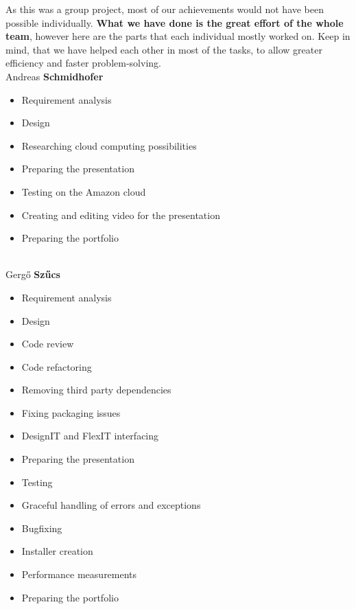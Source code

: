 \documentclass[a4paper, 11pt, article]{report}
\begin{document}
As this was a group project, most of our achievements would not have been possible individually. \textbf{What we have done is the great effort of the whole team}, however here are the parts that each individual mostly worked on. Keep in mind, that we have helped each other in most of the tasks, to allow greater efficiency and faster problem-solving. \\

\noindent Andreas \textbf{Schmidhofer} 
\begin{itemize}
	\item Requirement analysis
	\item Design
	\item Researching cloud computing possibilities
	\item Preparing the presentation
	\item Testing on the Amazon cloud
	\item Creating and editing video for the presentation
	\item Preparing the portfolio
\end{itemize} 

\noindent \\ Gergő \textbf{Szűcs}
\begin{itemize}
	\item Requirement analysis
	\item Design
	\item Code review
	\item Code refactoring
	\item Removing third party dependencies
	\item Fixing packaging issues
	\item DesignIT and FlexIT interfacing
	\item Preparing the presentation
	\item Testing 
	\item Graceful handling of errors and exceptions
	\item Bugfixing
	\item Installer creation
	\item Performance measurements
	\item Preparing the portfolio
\end{itemize}
\end{document}
